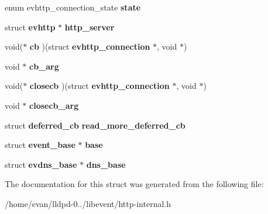 \begin{DoxyCompactItemize}
\item 
enum evhttp\-\_\-connection\-\_\-state {\bfseries state}\label{structevhttp__connection_a10516cefb6673d60b11773cc8dd87d69}

\item 
struct {\bf evhttp} $\ast$ {\bfseries http\-\_\-server}\label{structevhttp__connection_a74bda8098cf18dc3269a397b2acb0a2e}

\item 
void($\ast$ {\bfseries cb} )(struct {\bf evhttp\-\_\-connection} $\ast$, void $\ast$)\label{structevhttp__connection_ac2d47939335643151048ffea72177fb2}

\item 
void $\ast$ {\bfseries cb\-\_\-arg}\label{structevhttp__connection_aa2a0fc874870115f7d31aabcbb53ec0b}

\item 
void($\ast$ {\bfseries closecb} )(struct {\bf evhttp\-\_\-connection} $\ast$, void $\ast$)\label{structevhttp__connection_a568a224ad4803e212d164f3accdb5b49}

\item 
void $\ast$ {\bfseries closecb\-\_\-arg}\label{structevhttp__connection_a67ad9c8e13b320cfa74f2f52138ab55c}

\item 
struct {\bf deferred\-\_\-cb} {\bfseries read\-\_\-more\-\_\-deferred\-\_\-cb}\label{structevhttp__connection_aee8508461b01c2e113199275407ad7bf}

\item 
struct {\bf event\-\_\-base} $\ast$ {\bfseries base}\label{structevhttp__connection_ab1a154f7530a81e9dd1d63fc6b98a5c7}

\item 
struct {\bf evdns\-\_\-base} $\ast$ {\bfseries dns\-\_\-base}\label{structevhttp__connection_ae25945e708ff97da16b4e5e5757ae580}

\end{DoxyCompactItemize}


\-The documentation for this struct was generated from the following file\-:\begin{DoxyCompactItemize}
\item 
/home/evan/lldpd-\/0../libevent/http-\/internal.\-h\end{DoxyCompactItemize}
